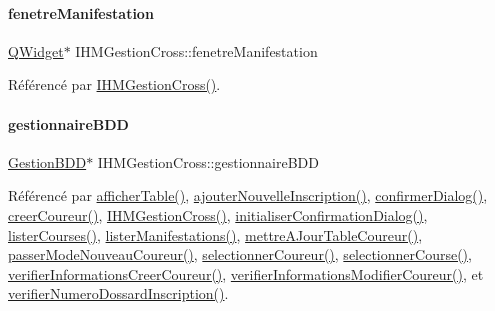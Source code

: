 \paragraph{\texorpdfstring{fenetre\+Manifestation}{fenetreManifestation}}
{\footnotesize\ttfamily \hyperlink{class_q_widget}{Q\+Widget}$\ast$ I\+H\+M\+Gestion\+Cross\+::fenetre\+Manifestation\hspace{0.3cm}{\ttfamily [private]}}



Référencé par \hyperlink{class_i_h_m_gestion_cross_a2c62fd83326a87456a403f46acc408c8}{I\+H\+M\+Gestion\+Cross()}.

\mbox{\label{class_i_h_m_gestion_cross_a440bac63a3e51db3e2c08e883f8cafc9}} 
\paragraph{\texorpdfstring{gestionnaire\+B\+DD}{gestionnaireBDD}}
{\footnotesize\ttfamily \hyperlink{class_gestion_b_d_d}{Gestion\+B\+DD}$\ast$ I\+H\+M\+Gestion\+Cross\+::gestionnaire\+B\+DD\hspace{0.3cm}{\ttfamily [private]}}



Référencé par \hyperlink{class_i_h_m_gestion_cross_ae1510779a1efa3defecb517467e84f91}{afficher\+Table()}, \hyperlink{class_i_h_m_gestion_cross_af0165d32344af78b4edce59f88c90ff6}{ajouter\+Nouvelle\+Inscription()}, \hyperlink{class_i_h_m_gestion_cross_a144933ab31ae263be7267b93bfd53a82}{confirmer\+Dialog()}, \hyperlink{class_i_h_m_gestion_cross_a6000b152ba3febb45d6c409519168ba2}{creer\+Coureur()}, \hyperlink{class_i_h_m_gestion_cross_a2c62fd83326a87456a403f46acc408c8}{I\+H\+M\+Gestion\+Cross()}, \hyperlink{class_i_h_m_gestion_cross_aa1c728319c825df582a014fc5bd43ea4}{initialiser\+Confirmation\+Dialog()}, \hyperlink{class_i_h_m_gestion_cross_a34567afe3e94862ebd9af51528dedb65}{lister\+Courses()}, \hyperlink{class_i_h_m_gestion_cross_a0eadd8592c966c89bf7b5a25a0ae7589}{lister\+Manifestations()}, \hyperlink{class_i_h_m_gestion_cross_a53c84315d723d75ad7b4a7d4c317efc5}{mettre\+A\+Jour\+Table\+Coureur()}, \hyperlink{class_i_h_m_gestion_cross_ac8f336c95a5f0c9eb8a4bc1c4bb83445}{passer\+Mode\+Nouveau\+Coureur()}, \hyperlink{class_i_h_m_gestion_cross_ad71963d500fd61995fdae94e833db163}{selectionner\+Coureur()}, \hyperlink{class_i_h_m_gestion_cross_ae555b32462455a2cdaf0f8dc2e016d14}{selectionner\+Course()}, \hyperlink{class_i_h_m_gestion_cross_ae08eec25f5a6d33bf133b0cee78c7c5c}{verifier\+Informations\+Creer\+Coureur()}, \hyperlink{class_i_h_m_gestion_cross_a0e088653019d8adefb371348f272d2e2}{verifier\+Informations\+Modifier\+Coureur()}, et \hyperlink{class_i_h_m_gestion_cross_a164be2d046cf18ee03e3939d03a5580d}{verifier\+Numero\+Dossard\+Inscription()}.

